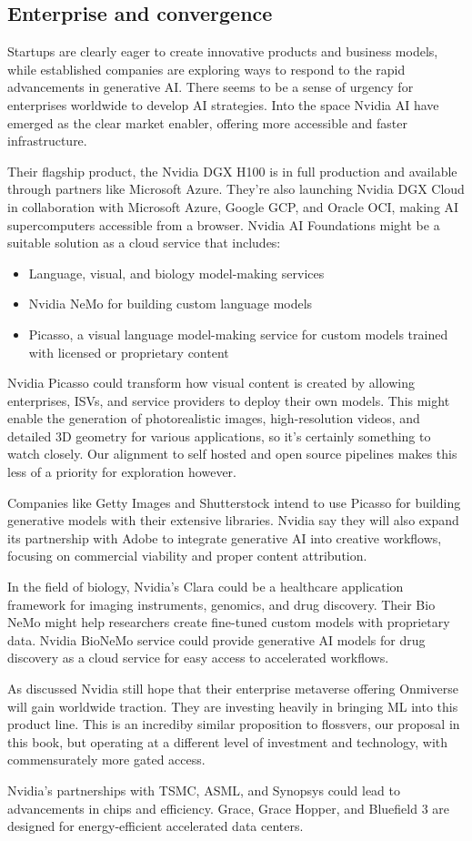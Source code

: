 \subsection{Enterprise and convergence}
Startups are clearly eager to create innovative products and business models, while established companies are exploring ways to respond to the rapid advancements in generative AI. There seems to be a sense of urgency for enterprises worldwide to develop AI strategies. Into the space Nvidia AI have emerged as the clear market enabler, offering more accessible and faster infrastructure.\par
Their flagship product, the Nvidia DGX H100 is in full production and available through partners like Microsoft Azure. They're also launching Nvidia DGX Cloud in collaboration with Microsoft Azure, Google GCP, and Oracle OCI, making AI supercomputers accessible from a browser. Nvidia AI Foundations might be a suitable solution as a cloud service that includes:
\begin{itemize}
\item Language, visual, and biology model-making services
\item Nvidia NeMo for building custom language models
\item Picasso, a visual language model-making service for custom models trained with licensed or proprietary content
\end{itemize} 
Nvidia Picasso could transform how visual content is created by allowing enterprises, ISVs, and service providers to deploy their own models. This might enable the generation of photorealistic images, high-resolution videos, and detailed 3D geometry for various applications, so it's certainly something to watch closely. Our alignment to self hosted and open source pipelines makes this less of a priority for exploration however.\par 
Companies like Getty Images and Shutterstock intend to use Picasso for building generative models with their extensive libraries. Nvidia say they will also expand its partnership with Adobe to integrate generative AI into creative workflows, focusing on commercial viability and proper content attribution.\par
In the field of biology, Nvidia's Clara could be a healthcare application framework for imaging instruments, genomics, and drug discovery. Their Bio NeMo might help researchers create fine-tuned custom models with proprietary data. Nvidia BioNeMo service could provide generative AI models for drug discovery as a cloud service for easy access to accelerated workflows.\par
As discussed Nvidia still hope that their enterprise metaverse offering Onmiverse will gain worldwide traction. They are investing heavily in bringing ML into this product line. This is an incrediby similar proposition to flossvers, our proposal in this book, but operating at a different level of investment and technology, with commensurately more gated access. \par
Nvidia's partnerships with TSMC, ASML, and Synopsys could lead to advancements in chips and efficiency. Grace, Grace Hopper, and Bluefield 3 are designed for energy-efficient accelerated data centers.\par
